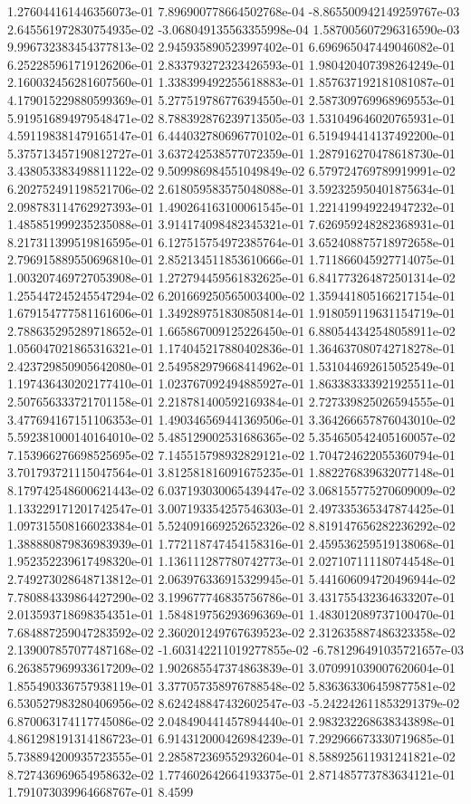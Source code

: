 1.276044161446356073e-01	7.896900778664502768e-04	-8.865500942149259767e-03	2.645561972830754935e-02	-3.068049135563355998e-04	1.587005607296316590e-03	9.996732383454377813e-02	2.945935890523997402e-01	6.696965047449046082e-01	6.252285961719126206e-01	2.833793272323426593e-01	1.980420407398264249e-01	2.160032456281607560e-01	1.338399492255618883e-01	1.857637192181081087e-01	4.179015229880599369e-01	5.277519786776394550e-01	2.587309769968969553e-01	5.919516894979548471e-02	8.788392876239713505e-03	1.531049646020765931e-01	4.591198381479165147e-01	6.444032780696770102e-01	6.519494414137492200e-01	5.375713457190812727e-01	3.637242538577072359e-01	1.287916270478618730e-01	3.438053383498811122e-02	9.509986984551049849e-02	6.579724769789919991e-02	6.202752491198521706e-02	2.618059583575048088e-01	3.592325950401875634e-01	2.098783114762927393e-01	1.490264163100061545e-01	1.221419949224947232e-01	1.485851999235235088e-01	3.914174098482345321e-01	7.626959248282368931e-01	8.217311399519816595e-01	6.127515754972385764e-01	3.652408875718972658e-01	2.796915889550696810e-01	2.852134511853610666e-01	1.711866045927714075e-01	1.003207469727053908e-01	1.272794459561832625e-01	6.841773264872501314e-02	1.255447245245547294e-02	6.201669250565003400e-02	1.359441805166217154e-01	1.679154777581161606e-01	1.349289751830850814e-01	1.918059119631154719e-01	2.788635295289718652e-01	1.665867009125226450e-01	6.880544342548058911e-02	1.056047021865316321e-01	1.174045217880402836e-01	1.364637080742718278e-01	2.423729850905642080e-01	2.549582979668414962e-01	1.531044692615052549e-01	1.197436430202177410e-01	1.023767092494885927e-01	1.863383333921925511e-01	2.507656333721701158e-01	2.218781400592169384e-01	2.727339825026594555e-01	3.477694167151106353e-01	1.490346569441369506e-01	3.364266657876043010e-02	5.592381000140164010e-02	5.485129002531686365e-02	5.354650542405160057e-02	7.153966276698525695e-02	7.145515798932829121e-02	1.704724622055360794e-01	3.701793721115047564e-01	3.812581816091675235e-01	1.882276839632077148e-01	8.179742548600621443e-02	6.037193030065439447e-02	3.068155775270609009e-02	1.133229171201742547e-01	3.007193354257546303e-01	2.497335365347874425e-01	1.097315508166023384e-01	5.524091669252652326e-02	8.819147656282236292e-02	1.388880879836983939e-01	1.772118747454158316e-01	2.459536259519138068e-01	1.952352239617498320e-01	1.136111287780742773e-01	2.027107111180744548e-01	2.749273028648713812e-01	2.063976336915329945e-01	5.441606094720496944e-02	7.780884339864427290e-02	3.199677746835756786e-01	3.431755432364633207e-01	2.013593718698354351e-01	1.584819756293696369e-01	1.483012089737100470e-01	7.684887259047283592e-02	2.360201249767639523e-02	2.312635887486323358e-02	2.139007857077487168e-02	-1.603142211019277855e-02	-6.781296491035721657e-03	6.263857969933617209e-02	1.902685547374863839e-01	3.070991039007620604e-01	1.855490336757938119e-01	3.377057358976788548e-02	5.836363306459877581e-02	6.530527983280406956e-02	8.624248847432602547e-03	-5.242242611853291379e-02	6.870063174117745086e-02	2.048490441457894440e-01	2.983232268638343898e-01	4.861298191314186723e-01	6.914312000426984239e-01	7.292966673330719685e-01	5.738894200935723555e-01	2.285872369552932604e-01	8.588925611931241821e-02	8.727436969654958632e-02	1.774602642664193375e-01	2.871485773783634121e-01	1.791073039964668767e-01	8.4599